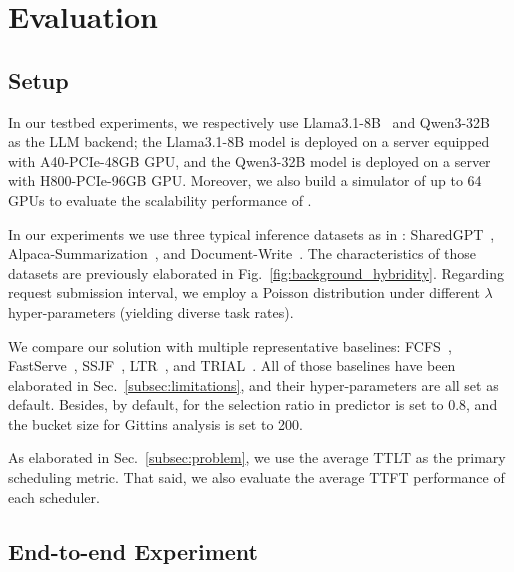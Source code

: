 \section{Evaluation}
\label{sec:eval}

\subsection{Setup}
In our testbed experiments, we respectively use Llama3.1-8B~\cite{llama3_1_8b_instruct} and Qwen3-32B~\cite{qwen3_32b} as the LLM backend; the Llama3.1-8B model is deployed on a server equipped with A40-PCIe-48GB GPU, and the Qwen3-32B model is deployed on a server with H800-PCIe-96GB GPU. 
Moreover, we also build a simulator of {up to 64 GPUs} to evaluate the scalability performance of \oursched.


In our experiments we use three typical inference datasets as in \cite{hu2024inference}: SharedGPT~\cite{sharegpt_vicuna_unfiltered_2025}, Alpaca-Summarization~\cite{alpaca_pubmed_summarization_2025}, and Document-Write~\cite{write_doc_sft_v1_2025}. 
The characteristics of those datasets are previously elaborated in Fig.~\ref{fig:background_hybridity}. 
Regarding request submission interval, we employ a Poisson distribution under different $\lambda$ hyper-parameters (yielding diverse task rates). 



We compare our \oursched solution with multiple representative baselines: FCFS~\cite{kwon2023efficient}, FastServe~\cite{wu2023fast}, SSJF~\cite{qiu2024efficient}, LTR~\cite{fu2024efficient}, and TRIAL~\cite{shahout2024don}.
All of those baselines have been elaborated in Sec.~\ref{subsec:limitations}, and their hyper-parameters are all set as default. 
Besides, by default, for \oursched the selection ratio in predictor is set to 0.8, and the bucket size for Gittins analysis is set to 200. 



As elaborated in Sec.~\ref{subsec:problem}, we use the average TTLT 
as the primary scheduling metric.
That said, we also evaluate the average TTFT 
performance of each scheduler.


\subsection{End-to-end Experiment}

